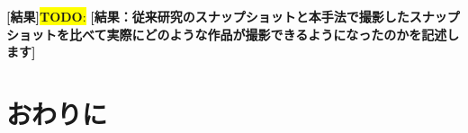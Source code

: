 \documentclass[uplatex,dvipdfmx,a4paper,twocolumn,base=11pt,jbase=11pt,ja=standard]{bxjsarticle}  %
\newcommand{\todo}[1]{\colorbox{yellow}{{\bf TODO}:}{\color{red} {\textbf{[#1]}}}}
\begin{document}
\noindent\textbf{[結果]}\todo{結果：従来研究のスナップショットと本手法で撮影したスナップショットを比べて実際にどのような作品が撮影できるようになったのかを記述します}










\section{おわりに}






\end{document}

